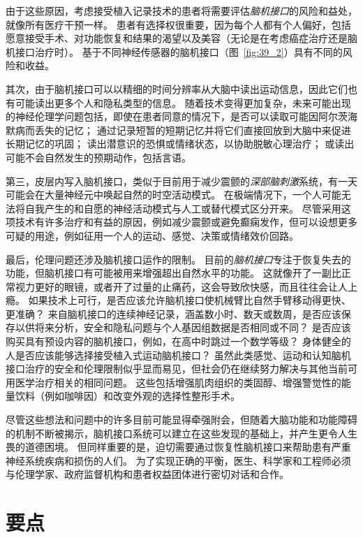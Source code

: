 由于这些原因，考虑接受植入记录技术的患者将需要评估\textit{脑机接口}的风险和益处，就像所有医疗干预一样。
患者有选择权很重要，因为每个人都有个人偏好，包括愿意接受手术、对功能恢复和结果的渴望以及美容（无论是在考虑癌症治疗还是脑机接口治疗时）。
基于不同神经传感器的脑机接口（图~\ref{fig:39_2}）具有不同的风险和收益。


其次，由于脑机接口可以以精细的时间分辨率从大脑中读出运动信息，因此它们也有可能读出更多个人和隐私类型的信息。
随着技术变得更加复杂，未来可能出现的神经伦理学问题包括，即使在患者同意的情况下，是否可以读取可能因阿尔茨海默病而丢失的记忆；
通过记录短暂的短期记忆并将它们直接回放到大脑中来促进长期记忆的巩固；
读出潜意识的恐惧或情绪状态，以协助脱敏心理治疗；
或读出可能不会自然发生的预期动作，包括言语。


第三，皮层内写入脑机接口，类似于目前用于减少震颤的\textit{深部脑刺激}系统，有一天可能会在大量神经元中唤起自然的时空活动模式。
在极端情况下，一个人可能无法将自我产生的和自愿的神经活动模式与人工或替代模式区分开来。
尽管采用这项技术有许多治疗和有益的原因，例如减少震颤或避免癫痫发作，但可以设想更多可疑的用途，例如征用一个人的运动、感觉、决策或情绪效价回路。


最后，伦理问题还涉及脑机接口运作的限制。
目前的\textit{脑机接口}专注于恢复失去的功能，但脑机接口有可能被用来增强超出自然水平的功能。
这就像开了一副比正常视力更好的眼镜，或者开了过量的止痛药，这会导致欣快感，而且往往会让人上瘾。
如果技术上可行，是否应该允许脑机接口使机械臂比自然手臂移动得更快、更准确？
来自脑机接口的连续神经记录，涵盖数小时、数天或数周，是否应该保存以供将来分析，安全和隐私问题与个人基因组数据是否相同或不同？
是否应该购买具有预设内容的脑机接口，例如，在高中时跳过一个数学等级？
身体健全的人是否应该能够选择接受植入式运动脑机接口？
虽然此类感觉、运动和认知脑机接口治疗的安全和伦理限制似乎显而易见，但社会仍在继续努力解决与其他当前可用医学治疗相关的相同问题。
这些包括增强肌肉组织的类固醇、增强警觉性的能量饮料（例如咖啡因）和改变外观的选择性整形手术。


尽管这些想法和问题中的许多目前可能显得牵强附会，但随着大脑功能和功能障碍的机制不断被揭示，脑机接口系统可以建立在这些发现的基础上，并产生更令人生畏的道德困境。
但同样重要的是，迫切需要通过恢复性脑机接口来帮助患有严重神经系统疾病和损伤的人们。
为了实现正确的平衡，医生、科学家和工程师必须与伦理学家、政府监督机构和患者权益团体进行密切对话和合作。



\section{要点}

